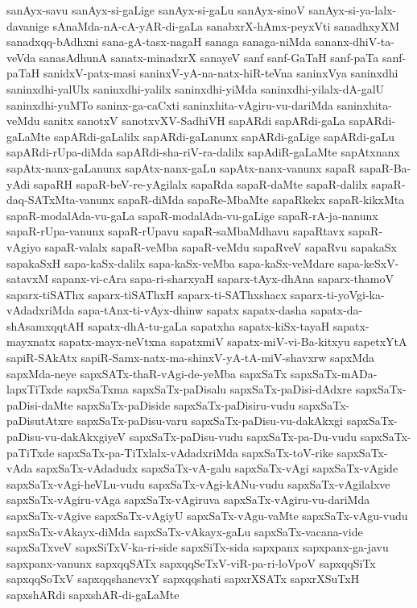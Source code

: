{sanAyx-savu
sanAyx-si-gaLige
sanAyx-si-gaLu
sanAyx-sinoV
sanAyx-si-ya-lalx-davanige
sAnaMda-nA-cA-yAR-di-gaLa
sanabxrX-hAmx-peyxVti
sanadhxyXM
sanadxqq-bAdhxni
sana-gA-tasx-nagaH
sanaga
sanaga-niMda
sananx-dhiV-ta-veVda
sanasAdhunA
sanatx-minadxrX
sanayeV
sanf
sanf-GaTaH
sanf-paTa
sanf-paTaH
sanidxV-patx-masi
saninxV-yA-na-natx-hiR-teVna
saninxVya
saninxdhi
saninxdhi-yalUlx
saninxdhi-yalilx
saninxdhi-yiMda
saninxdhi-yilalx-dA-galU
saninxdhi-yuMTo
saninx-ga-caCxti
saninxhita-vAgiru-vu-dariMda
saninxhita-veMdu
sanitx
sanotxV
sanotxvXV-SadhiVH
sapARdi
sapARdi-gaLa
sapARdi-gaLaMte
sapARdi-gaLalilx
sapARdi-gaLanunx
sapARdi-gaLige
sapARdi-gaLu
sapARdi-rUpa-diMda
sapARdi-sha-riV-ra-dalilx
sapAdiR-gaLaMte
sapAtxnanx
sapAtx-nanx-gaLanunx
sapAtx-nanx-gaLu
sapAtx-nanx-vanunx
sapaR
sapaR-Ba-yAdi
sapaRH
sapaR-beV-re-yAgilalx
sapaRda
sapaR-daMte
sapaR-dalilx
sapaR-daq-SATxMta-vanunx
sapaR-diMda
sapaRe-MbaMte
sapaRkekx
sapaR-kikxMta
sapaR-modalAda-vu-gaLa
sapaR-modalAda-vu-gaLige
sapaR-rA-ja-nanunx
sapaR-rUpa-vanunx
sapaR-rUpavu
sapaR-saMbaMdhavu
sapaRtavx
sapaR-vAgiyo
sapaR-valalx
sapaR-veMba
sapaR-veMdu
sapaRveV
sapaRvu
sapakaSx
sapakaSxH
sapa-kaSx-dalilx
sapa-kaSx-veMba
sapa-kaSx-veMdare
sapa-keSxV-satavxM
sapanx-vi-cAra
sapa-ri-sharxyaH
saparx-tAyx-dhAna
saparx-thamoV
saparx-tiSAThx
saparx-tiSAThxH
saparx-ti-SAThxshacx
saparx-ti-yoVgi-ka-vAdadxriMda
sapa-tAnx-ti-vAyx-dhinw
sapatx
sapatx-dasha
sapatx-da-shAsamxqqtAH
sapatx-dhA-tu-gaLa
sapatxha
sapatx-kiSx-tayaH
sapatx-mayxnatx
sapatx-mayx-neVtxna
sapatxmiV
sapatx-miV-vi-Ba-kitxyu
sapetxYtA
sapiR-SAkAtx
sapiR-Samx-natx-ma-shinxV-yA-tA-miV-shavxrw
sapxMda
sapxMda-neye
sapxSATx-thaR-vAgi-de-yeMba
sapxSaTx
sapxSaTx-mADa-lapxTiTxde
sapxSaTxma
sapxSaTx-paDisalu
sapxSaTx-paDisi-dAdxre
sapxSaTx-paDisi-daMte
sapxSaTx-paDiside
sapxSaTx-paDisiru-vudu
sapxSaTx-paDisutAtxre
sapxSaTx-paDisu-varu
sapxSaTx-paDisu-vu-dakAkxgi
sapxSaTx-paDisu-vu-dakAkxgiyeV
sapxSaTx-paDisu-vudu
sapxSaTx-pa-Du-vudu
sapxSaTx-paTiTxde
sapxSaTx-pa-TiTxlalx-vAdadxriMda
sapxSaTx-toV-rike
sapxSaTx-vAda
sapxSaTx-vAdadudx
sapxSaTx-vA-galu
sapxSaTx-vAgi
sapxSaTx-vAgide
sapxSaTx-vAgi-heVLu-vudu
sapxSaTx-vAgi-kANu-vudu
sapxSaTx-vAgilalxve
sapxSaTx-vAgiru-vAga
sapxSaTx-vAgiruva
sapxSaTx-vAgiru-vu-dariMda
sapxSaTx-vAgive
sapxSaTx-vAgiyU
sapxSaTx-vAgu-vaMte
sapxSaTx-vAgu-vudu
sapxSaTx-vAkayx-diMda
sapxSaTx-vAkayx-gaLu
sapxSaTx-vacana-vide
sapxSaTxveV
sapxSiTxV-ka-ri-side
sapxSiTx-sida
sapxpanx
sapxpanx-ga-javu
sapxpanx-vanunx
sapxqqSATx
sapxqqSeTxV-viR-pa-ri-loVpoV
sapxqqSiTx
sapxqqSoTxV
sapxqqshanevxY
sapxqqshati
sapxrXSATx
sapxrXSuTxH
sapxshARdi
sapxshAR-di-gaLaMte
}
